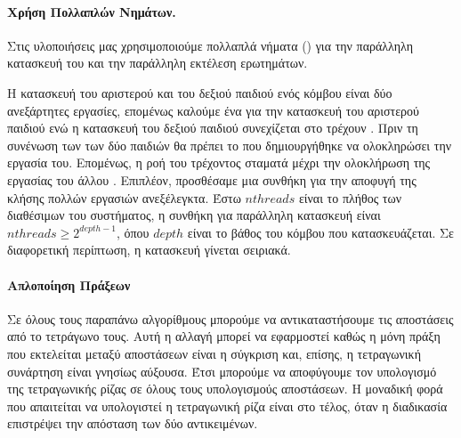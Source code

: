 \paragraph{Χρήση Πολλαπλών Νημάτων.}
Στις υλοποιήσεις μας χρησιμοποιούμε πολλαπλά νήματα ()
για την παράλληλη κατασκευή του  και την παράλληλη 
εκτέλεση ερωτημάτων.

Η κατασκευή του αριστερού και του δεξιού παιδιού ενός κόμβου
είναι  δύο ανεξάρτητες εργασίες, επομένως καλούμε 
ένα  για την κατασκευή του αριστερού παιδιού 
ενώ η κατασκευή του δεξιού παιδιού συνεχίζεται στο 
τρέχουν .
Πριν τη συνένωση των  των δύο παιδιών θα πρέπει 
το  που δημιουργήθηκε να ολοκληρώσει την εργασία 
του. 
Επομένως, η ροή του τρέχοντος  σταματά μέχρι την 
ολοκλήρωση της εργασίας του άλλου .
Επιπλέον, προσθέσαμε μια συνθήκη για την αποφυγή της κλήσης 
πολλών εργασιών ανεξέλεγκτα.
Έστω $nthreads$ είναι το πλήθος των διαθέσιμων 
του συστήματος, η συνθήκη για παράλληλη κατασκευή είναι 
$nthreads \geq 2^{depth-1}$, όπου $depth$ είναι το βάθος του 
κόμβου που κατασκευάζεται.
Σε διαφορετική περίπτωση, η κατασκευή γίνεται σειριακά.

\paragraph{Απλοποίηση Πράξεων}
Σε όλους τους παραπάνω αλγορίθμους μπορούμε να αντικαταστήσουμε 
τις αποστάσεις από το τετράγωνο τους.
Αυτή η αλλαγή μπορεί να εφαρμοστεί καθώς η μόνη πράξη που 
εκτελείται μεταξύ αποστάσεων είναι η σύγκριση και, επίσης,
η τετραγωνική συνάρτηση είναι γνησίως αύξουσα.
Έτσι μπορούμε να αποφύγουμε τον υπολογισμό της τετραγωνικής ρίζας 
σε όλους τους υπολογισμούς αποστάσεων.
Η μοναδική φορά που απαιτείται να υπολογιστεί η τετραγωνική ρίζα 
είναι στο τέλος, όταν η διαδικασία επιστρέψει την απόσταση των 
δύο αντικειμένων.

